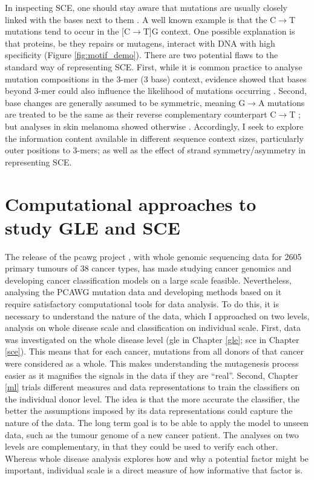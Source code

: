 In inspecting SCE, one should stay aware that mutations are usually closely linked with the \glspl{base} next to them \citep{Zhu2017}. A well known example is that the C$\rightarrow$T mutations tend to occur in the [C$\rightarrow$T]G context. One possible explanation is that proteins, be they repairs or mutagens, interact with DNA with high specificity (Figure \ref{fig:motif_demo}). There are two potential flaws to the standard way of representing SCE. First, while it is common practice to analyse mutation compositions in the 3-mer (3 base) context, evidence showed that bases beyond 3-mer could also influence the likelihood of mutations occurring \citep{Zhu2017,Zhu2020}. Second, base changes are generally assumed to be symmetric, meaning G$\rightarrow$A mutations are treated to be the same as their reverse complementary counterpart C$\rightarrow$T \citep{Alexandrov2013, Jiao2020}; but analyses in skin melanoma showed otherwise \citep{Zhu2017}. Accordingly, I seek to explore the information content available in different sequence context sizes, particularly outer positions to 3-mers; as well as the effect of strand symmetry/asymmetry in representing SCE.



\section{Computational approaches to study GLE and SCE}
\label{intro:ml}

The release of the \gls{pcawg} project \citep{Campbell2020}, with whole genomic sequencing data for 2605 primary tumours of 38 cancer types, has made studying cancer genomics and developing cancer classification models on a large scale feasible. Nevertheless, analysing the PCAWG mutation data and developing methods based on it require satisfactory computational tools for data analysis. To do this, it is necessary to understand the nature of the data, which I approached on two levels, analysis on whole disease scale and classification on individual scale. First, data was investigated on the whole disease level (\gls{gle} in Chapter \ref{gle}; \gls{sce} in Chapter \ref{sce}). This means that for each cancer, mutations from all donors of that cancer were considered as a whole. This makes understanding the mutagenesis process easier as it magnifies the signals in the data if they are ``real''. Second, Chapter \ref{ml} trials different measures and data representations to train the classifiers on the individual donor level. The idea is that the more accurate the classifier, the better the assumptions imposed by its data representations could capture the nature of the data. The long term goal is to be able to apply the model to unseen data, such as the tumour genome of a new cancer patient. The analyses on two levels are complementary, in that they could be used to verify each other. Whereas whole disease analysis explores how and why a potential factor might be important, individual scale is a direct measure of how informative that factor is.  

